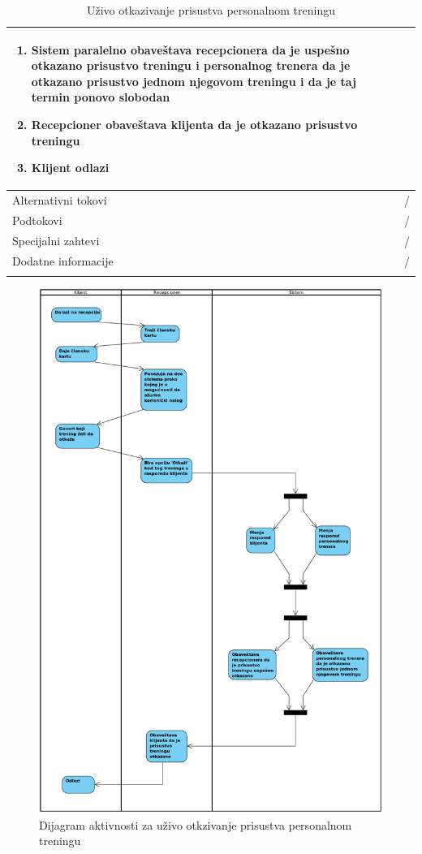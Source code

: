 \begin{longtable}{| p{} | p{} |}
\begin{enumerate}
    \item Sistem paralelno obaveštava recepcionera da je uspešno otkazano prisustvo treningu i personalnog trenera da je otkazano prisustvo jednom njegovom treningu i da je taj termin ponovo slobodan
    \item Recepcioner obaveštava klijenta da je otkazano prisustvo treningu
    \item Klijent odlazi
   \end{enumerate}\\
\hline
    Alternativni tokovi & /\\
\hline
    Podtokovi & /\\
\hline
    Specijalni zahtevi & /\\
\hline
    Dodatne informacije & /\\
\hline
\caption{Uživo otkazivanje prisustva personalnom treningu}
\end{longtable}

\newpage
\begin{figure}[!ht]
\begin{center}
\includegraphics[scale=0.35]{sections/images/dijagram_aktivnosti_personalni_otkazivanje_uzivo.png}
\end{center}
\caption{Dijagram aktivnosti za uživo otkzivanje prisustva personalnom treningu}
\label{fig:kontekst}
\end{figure}




